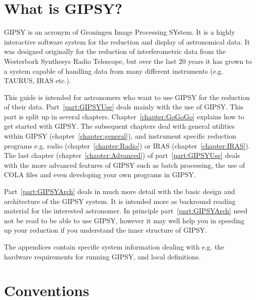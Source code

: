 \vspace*{2cm}

\clearpage


\tableofcontents

\clearpage



\label{chapter:intro}

\section*{What is GIPSY?}

GIPSY is an acronym of Groningen Image Processing SYstem. It is a
highly interactive software system for the reduction and
display of astronomical data. It was designed originally for the
reduction of interferometric data from the Westerbork Synthesys Radio
Telescope, but over the last 20 years it has grown to a system capable
of handling data from many different instruments (e.g. TAURUS, IRAS etc.).

This guide is intended for astronomers who want to use GIPSY for the
reduction of their data.  Part~\ref{part:GIPSYUse} deals mainly with the
use of GIPSY.  This part is split up in several chapters. 
Chapter~\ref{chapter:GoGoGo} explains how to get started with GIPSY. 
The subsequent chapters deal with general utilities within GIPSY
(chapter~\ref{chapter:general}), and instrument specific reduction
programs e.g.  radio (chapter~\ref{chapter:Radio}) or IRAS
(chapter~\ref{chapter:IRAS}).  The last chapter
(chapter~\ref{chapter:Advanced}) of part~\ref{part:GIPSYUse} deals with
the more advanced features of GIPSY such as batch processing, the use of 
COLA files and even developing your own programs in GIPSY. 

Part~\ref{part:GIPSYArch} deals in much more detail with the basic
design and architecture of the GIPSY system. It is intended more as
backround reading material for the interested astronomer. In principle
part~\ref{part:GIPSYArch} need not be read to be able to use GIPSY,
however it may well help you in speeding up your reduction if you
understand the inner structure of GIPSY.

The appendices contain specific system information dealing with e.g. the 
hardware requirements for running GIPSY, and local definitions.  

\clearpage

\section*{Conventions}

